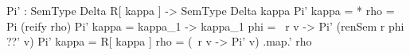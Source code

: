 \begin{agdaf}
Pi' : SemType Delta R[ kappa ] -> SemType Delta kappa
Pi' {kappa = *} rho = Pi (reify rho)
Pi' {kappa = kappa_1 -> kappa_1} phi = \ r v -> Pi' (renSem r phi ??' v)
Pi' {kappa = R[ kappa ]} rho = (\ r v -> Pi' v) .map.' rho
\end{agdaf}
